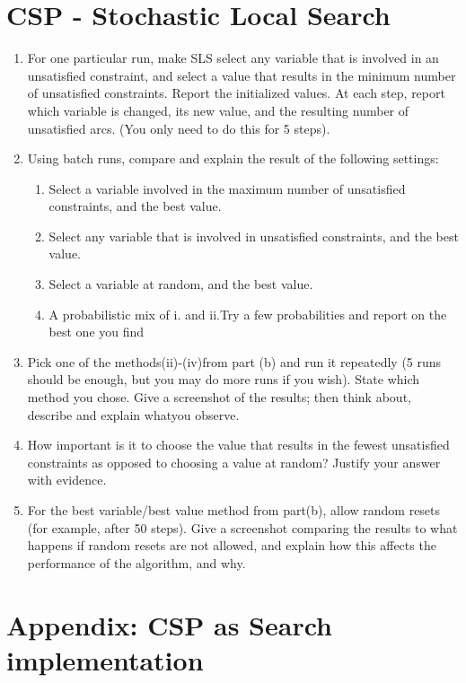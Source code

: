 \documentclass{article}
\def\ans#1{{\color{ans}#1}}
\begin{document}
\section{CSP - Stochastic Local Search}
\begin{enumerate}[label=(\alph*)]
    \item For one particular run, make SLS select any variable that is involved in an unsatisfied constraint, and select a value that results in the minimum number of unsatisfied constraints. Report the initialized values.  At each step, report which variable is changed, its new value, and the resulting number of unsatisfied arcs. (You only need to do this for 5 steps).
    \ans{
    }
    \item Using batch runs, compare and explain the result of the following settings:
    \begin{enumerate}[label=(\roman*)]
        \item Select a variable involved in the maximum number of unsatisfied constraints, and the best value.
        \ans{
        }
        \item Select any variable that is involved in unsatisfied constraints, and the best value.
        \ans{
        }
        \item Select a variable at random, and the best value.
        \ans{
        }
        \item A probabilistic mix of i. and ii.Try a few probabilities and report on the best one you find
        \ans{
        }
    \end{enumerate}
    \item Pick one of the methods(ii)-(iv)from part (b) and run it repeatedly (5 runs should be enough, but you may do more runs if you wish). State which method you chose. Give a screenshot of the results; then think about, describe and explain whatyou observe.
    \ans{
    }
    \item How important is it to choose the value that results in the fewest unsatisfied constraints as opposed to choosing a value at random? Justify your answer with evidence.
    \ans{
    }
    \item For the best variable/best value method from part(b), allow random resets (for example, after 50 steps). Give a screenshot comparing the results to what happens if random resets are not allowed, and explain how this affects the performance of the algorithm, and why.
    \ans{
    }
\end{enumerate}


\appendix

\section{Appendix: CSP as Search implementation}
\label{appendix:CSP Search}
\begin{center}
    
\end{center}
\end{document}
